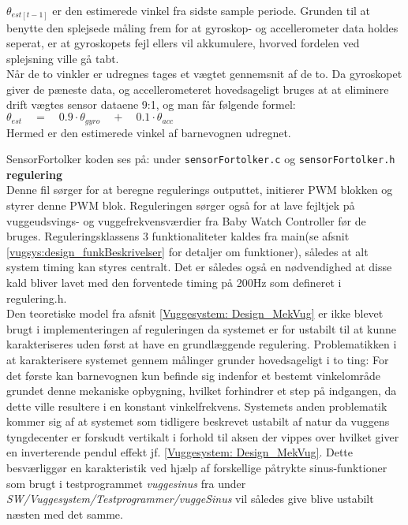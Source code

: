 ${ \theta  }_{ est\left[ t-1 \right]  }$ er den estimerede vinkel fra sidste sample periode. Grunden til at benytte den splejsede måling frem for at gyroskop- og accellerometer data holdes seperat, er at gyroskopets fejl ellers vil akkumulere, hvorved fordelen ved splejsning ville gå tabt.\\
Når de to vinkler er udregnes tages et vægtet gennemsnit af de to. Da gyroskopet giver de pæneste data, og accellerometeret hovedsageligt bruges at at eliminere drift vægtes sensor dataene 9:1, og man får følgende formel:\\
	${ \theta  }_{ est }\quad =\quad 0.9\cdot { \theta  }_{ gyro }\quad +\quad 0.1\cdot { \theta  }_{ acc }$ \\
Hermed er den estimerede vinkel af barnevognen udregnet.

SensorFortolker koden ses på: \citep{cd} under \verb+sensorFortolker.c+ og \verb+sensorFortolker.h+\\

\textbf{regulering}\label{vuggesystem_impl:regulering}  \\
Denne fil sørger for at beregne regulerings outputtet, initierer PWM blokken og styrer denne PWM blok. Reguleringen sørger også for at lave fejltjek på vuggeudsvings- og vuggefrekvensværdier fra Baby Watch Controller før de bruges. Reguleringsklassens 3 funktionaliteter kaldes fra main(se afsnit \vref{vugsys:design_funkBeskrivelser} for detaljer om funktioner), således at alt system timing kan styres centralt. Det er således også en nødvendighed at disse kald bliver lavet med den forventede timing på 200Hz som defineret i regulering.h.\\

Den teoretiske model fra afsnit \vref{Vuggesystem: Design_MekVug} er ikke blevet brugt i implementeringen af reguleringen da systemet er for ustabilt til at kunne karakteriseres uden først at have en grundlæggende regulering. Problematikken i at karakterisere systemet gennem målinger grunder hovedsageligt i to ting: For det første kan barnevognen kun befinde sig indenfor et bestemt vinkelområde grundet denne mekaniske opbygning, hvilket forhindrer et step på indgangen, da dette ville resultere i en konstant vinkelfrekvens. Systemets anden problematik kommer sig af at systemet som tidligere beskrevet ustabilt af natur da vuggens tyngdecenter er forskudt vertikalt i forhold til aksen der vippes over hvilket giver en inverterende pendul effekt jf. \vref{Vuggesystem: Design_MekVug}. Dette besværliggør en karakteristik ved hjælp af forskellige påtrykte sinus-funktioner som brugt i testprogrammet \textit{vuggesinus} fra \citep{cd} under \textit{SW/Vuggesystem/Testprogrammer/vuggeSinus} vil således give blive ustabilt næsten med det samme.\\

